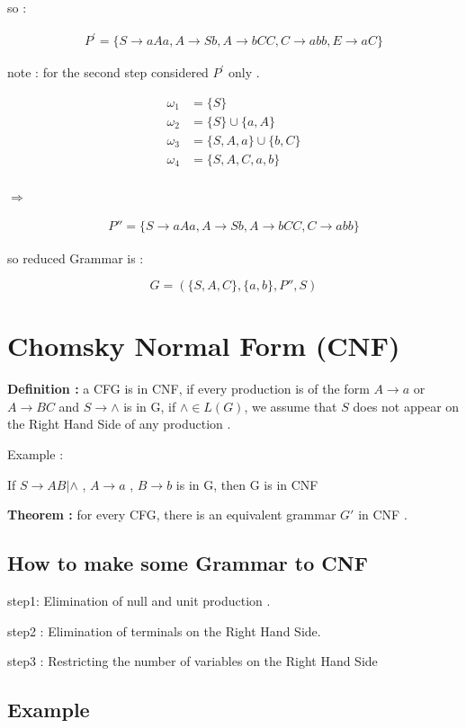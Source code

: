 \documentclass[12pt]{book}
\begin{document}
so :

\begin{align*}
P^{\prime} = \{ S \to aAa , A \to Sb , A \to bCC , C \to abb , E \to aC \}
\end{align*}

note : for the second step considered $P^{\prime}$ only .

\begin{align*}
\omega_{1} &= \{ S \}   \\
\omega_{2} &= \{ S \} \cup \{ a, A \} \\
\omega_{3} &= \{ S, A, a \} \cup \{ b, C \} \\
\omega_{4} &= \{ S, A, C, a, b \} \\
\end{align*}

$\Rightarrow$

\begin{align*}
P'' = \{ S \to aAa , A \to Sb , A \to bCC , C \to abb \}
\end{align*}

so reduced Grammar is :

$$
G = ( \{ S, A, C \} , \{ a, b \} , P'' , S )
$$


\section{Chomsky Normal Form (CNF)}

\textbf{Definition : } a CFG is in CNF, if every production is of the form $A \to a$ or $A \to BC$ and $S \to \wedge$ is in G, if $\wedge \in L(G)$, we assume that $S$ does not appear on the Right Hand Side of any production .

Example : 

If $S \to AB | \wedge$ , $A \to a$ , $B \to b$ is in G, then G is in CNF

\textbf{Theorem : } for every CFG, there is an equivalent grammar $G'$ in CNF .

\subsection{How to make some Grammar to CNF}

step1: Elimination of null and unit production .

step2 : Elimination of terminals on the Right Hand Side.

step3 : Restricting the number of variables on the Right Hand Side

\subsection{Example}
\end{document}
